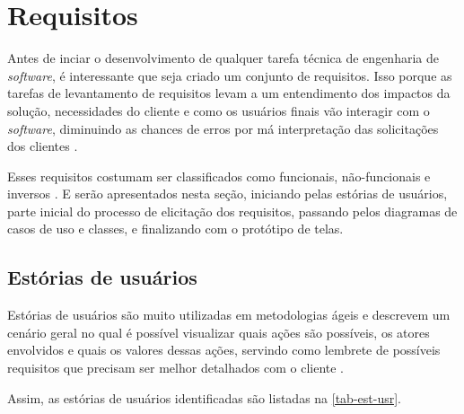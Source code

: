 \section{Requisitos}

Antes de inciar o desenvolvimento de qualquer tarefa técnica de engenharia de \emph{software}, é interessante que seja criado
um conjunto de requisitos.
Isso porque as tarefas de levantamento de requisitos levam a um entendimento dos impactos da solução, necessidades do cliente e
como os usuários finais vão interagir com o \emph{software}, diminuindo as chances de erros por má interpretação das solicitações
dos clientes \cite{pressman2014software}.

Esses requisitos costumam ser classificados como funcionais, não-funcionais e inversos \cite{sommerville2007engenharia}.
E serão apresentados nesta seção, iniciando pelas estórias de usuários, parte inicial do processo de elicitação
dos requisitos, passando pelos diagramas de casos de uso e classes, e finalizando com o protótipo de telas.

\newpage

\subsection{Estórias de usuários}

Estórias de usuários são muito utilizadas em metodologias ágeis e descrevem um cenário geral no qual é possível visualizar
quais ações são possíveis, os atores envolvidos e quais os valores dessas ações, servindo como lembrete
de possíveis requisitos que precisam ser melhor detalhados com o cliente \cite{nawrocki2014agile}.

Assim, as estórias de usuários identificadas são listadas na \autoref{tab-est-usr}.

